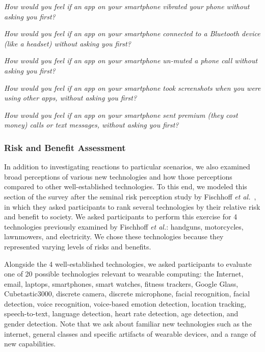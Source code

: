 \documentclass{acm_proc_article-sp}
\def\etal{{\it et al.~}}
\newenvironment{packed_enum}{
\begin{enumerate}
  \setlength{\itemsep}{1pt}
  \setlength{\parskip}{0pt}
  \setlength{\parsep}{0pt}
}{\end{enumerate}}
\begin{document}
\begin{packed_enum}
\item \textit{How would you feel if an app on your smartphone vibrated your phone without asking you first?}
\item \textit{How would you feel if an app on your smartphone connected to a Bluetooth device (like a headset) without asking you first?}
\item \textit{How would you feel if an app on your smartphone un-muted a phone call without asking you first?}
\item \textit{How would you feel if an app on your smartphone took screenshots when you were using other apps, without asking you first?}
\item \textit{How would you feel if an app on your smartphone sent premium (they cost money) calls or text messages, without asking you first?} 
\end{packed_enum}

\subsubsection{Risk and Benefit Assessment}
In addition to investigating reactions to particular scenarios, we also examined broad perceptions of various new technologies and how those perceptions compared to other well-established technologies. To this end, we modeled this section of the survey after the seminal risk perception study by Fischhoff \etal\cite{Fischhoff}, in which they asked participants to rank several technologies by their relative risk and benefit to society. We asked participants to perform this exercise for 4 technologies previously examined by Fischhoff {\it et al.}: handguns, motorcycles, lawnmowers, and electricity. We chose these technologies because they represented varying levels of risks and benefits.

Alongside the 4 well-established technologies, we asked participants to evaluate one of 20 possible technologies relevant to wearable computing: the Internet, email, laptops, smartphones, smart watches, fitness trackers, Google Glass, Cubetastic3000, discrete camera, discrete microphone, facial recognition, facial detection, voice recognition, voice-based emotion detection, location tracking, speech-to-text, language detection, heart rate detection, age detection, and gender detection. Note that we ask about familiar new technologies such as the internet, general classes and specific artifacts of wearable devices, and a range of new capabilities. 
\end{document}
